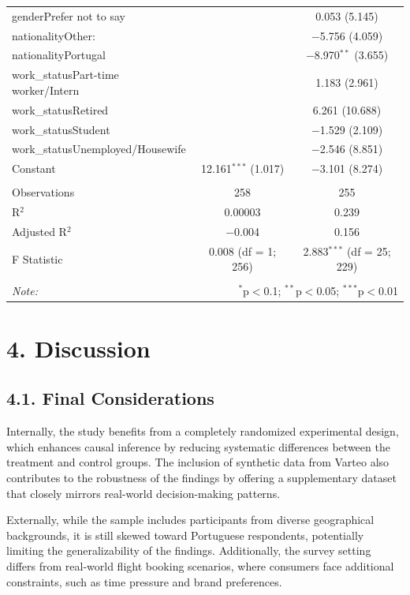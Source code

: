 \documentclass[
]{article}
\begin{document}
\begin{table}[!htbp]
\begin{tabular}{@{\extracolsep{3pt}}lcc}
  genderPrefer not to say &  & 0.053 (5.145) \\ 
  nationalityOther: &  & $-$5.756 (4.059) \\ 
  nationalityPortugal &  & $-$8.970$^{**}$ (3.655) \\ 
  work\_statusPart-time worker/Intern &  & 1.183 (2.961) \\ 
  work\_statusRetired &  & 6.261 (10.688) \\ 
  work\_statusStudent &  & $-$1.529 (2.109) \\ 
  work\_statusUnemployed/Housewife &  & $-$2.546 (8.851) \\ 
  Constant & 12.161$^{***}$ (1.017) & $-$3.101 (8.274) \\ 
 \hline \\[-1.8ex] 
Observations & 258 & 255 \\ 
R$^{2}$ & 0.00003 & 0.239 \\ 
Adjusted R$^{2}$ & $-$0.004 & 0.156 \\ 
F Statistic & 0.008 (df = 1; 256) & 2.883$^{***}$ (df = 25; 229) \\ 
\hline 
\hline \\[-1.8ex] 
\textit{Note:}  & \multicolumn{2}{r}{$^{*}$p$<$0.1; $^{**}$p$<$0.05; $^{***}$p$<$0.01} \\ 
\end{tabular} 
\end{table}

\newpage

\hypertarget{discussion}{%
\section{4. Discussion}\label{discussion}}

\hypertarget{final-considerations}{%
\subsection{4.1. Final Considerations}\label{final-considerations}}

Internally, the study benefits from a completely randomized experimental
design, which enhances causal inference by reducing systematic
differences between the treatment and control groups. The inclusion of
synthetic data from Varteo also contributes to the robustness of the
findings by offering a supplementary dataset that closely mirrors
real-world decision-making patterns.

Externally, while the sample includes participants from diverse
geographical backgrounds, it is still skewed toward Portuguese
respondents, potentially limiting the generalizability of the findings.
Additionally, the survey setting differs from real-world flight booking
scenarios, where consumers face additional constraints, such as time
pressure and brand preferences.
\end{document}
